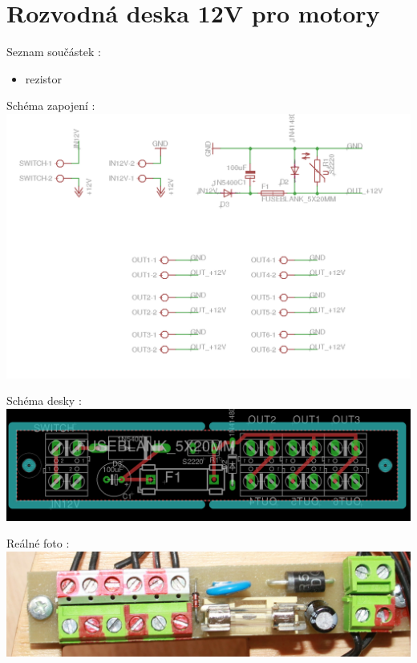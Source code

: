 \section{Rozvodná deska 12V pro motory} 


Seznam součástek :

\begin{itemize}
	\item rezistor
\end{itemize} 

Schéma zapojení :\\

\includegraphics[scale=0.3]{./circuit_boards/img/schema/rozvod_12V_motor.png}

Schéma desky :\\

\includegraphics[scale=0.3]{./circuit_boards/img/board/rozvod_12V_motor.png}

Reálné foto :\\

\includegraphics[scale=0.3]{./circuit_boards/img/real/rozvod_12V_motor.JPG}